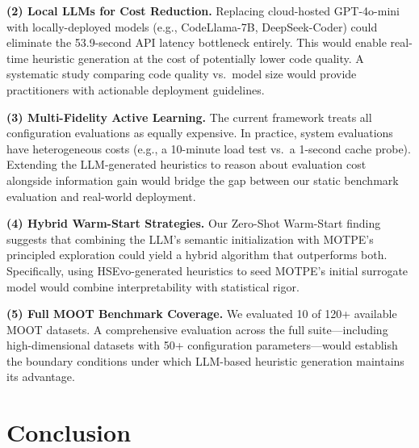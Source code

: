 \documentclass[sigconf,nonacm]{acmart}
\begin{document}
\textbf{(2) Local LLMs for Cost Reduction.} Replacing cloud-hosted GPT-4o-mini with locally-deployed models (e.g., CodeLlama-7B, DeepSeek-Coder) could eliminate the 53.9-second API latency bottleneck entirely. This would enable real-time heuristic generation at the cost of potentially lower code quality. A systematic study comparing code quality vs.\ model size would provide practitioners with actionable deployment guidelines.

\textbf{(3) Multi-Fidelity Active Learning.} The current framework treats all configuration evaluations as equally expensive. In practice, system evaluations have heterogeneous costs (e.g., a 10-minute load test vs.\ a 1-second cache probe). Extending the LLM-generated heuristics to reason about evaluation cost alongside information gain would bridge the gap between our static benchmark evaluation and real-world deployment.

\textbf{(4) Hybrid Warm-Start Strategies.} Our Zero-Shot Warm-Start finding suggests that combining the LLM's semantic initialization with MOTPE's principled exploration could yield a hybrid algorithm that outperforms both. Specifically, using HSEvo-generated heuristics to seed MOTPE's initial surrogate model would combine interpretability with statistical rigor.

\textbf{(5) Full MOOT Benchmark Coverage.} We evaluated 10 of 120+ available MOOT datasets. A comprehensive evaluation across the full suite---including high-dimensional datasets with 50+ configuration parameters---would establish the boundary conditions under which LLM-based heuristic generation maintains its advantage.

\section{Conclusion}
\end{document}
